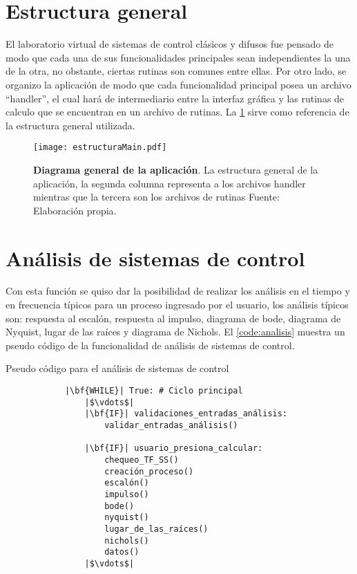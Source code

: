 \section{Estructura general}

    El laboratorio virtual de sistemas de control clásicos y difusos fue pensado de modo que cada una de sus funcionalidades principales sean independientes la una de la otra, no obstante, ciertas rutinas son comunes entre ellas. Por otro lado, se organizo la aplicación de modo que cada funcionalidad principal posea un archivo \enquote{handler}, el cual hará de intermediario entre la interfaz gráfica y las rutinas de calculo que se encuentran en un archivo de rutinas. La \cref{fig:estructuraMain} sirve como referencia de la estructura general utilizada.

    \begin{figure}[htb]
        \centering
        \texttt{[image: estructuraMain.pdf]}
        \caption[Diagrama general de la aplicación]{\textbf{Diagrama general de la aplicación}. La estructura general de la aplicación, la segunda columna representa a los archivos handler mientras que la tercera son los archivos de rutinas  Fuente: Elaboración propia.} 
        \label{fig:estructuraMain}
    \end{figure}

\section{Análisis de sistemas de control}
    
    Con esta función se quiso dar la posibilidad de realizar los análisis en el tiempo y en frecuencia típicos para un proceso ingresado por el usuario, los análisis típicos son: respuesta al escalón, respuesta al impulso, diagrama de bode, diagrama de Nyquist, lugar de las raíces y diagrama de Nichols. El \cref{code:analisis} muestra un pseudo código de la funcionalidad de análisis de sistemas de control.

    \begin{longlisting}
        \caption{Pseudo código para el análisis de sistemas de control}
        \label{code:analisis}				
        \begin{verbatim}
            |\bf{WHILE}| True: # Ciclo principal
                |$\vdots$|
                |\bf{IF}| validaciones_entradas_análisis:
                    validar_entradas_análisis()
                
                |\bf{IF}| usuario_presiona_calcular:
                    chequeo_TF_SS()
                    creación_proceso()
                    escalón()
                    impulso()
                    bode()
                    nyquist()
                    lugar_de_las_raíces()
                    nichols()
                    datos()
                |$\vdots$|
        \end{verbatim}
    \end{longlisting}

